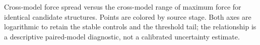 Cross-model force spread versus the cross-model range of maximum force for identical candidate structures. Points are colored by source stage. Both axes are logarithmic to retain the stable controls and the threshold tail; the relationship is a descriptive paired-model diagnostic, not a calibrated uncertainty estimate.
